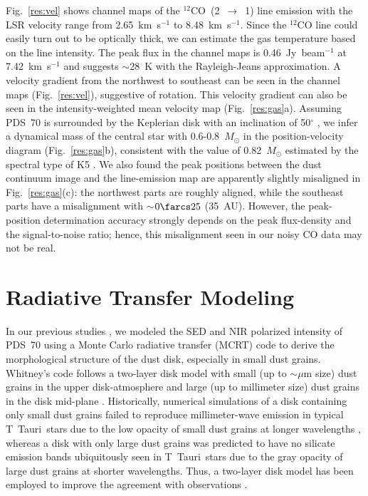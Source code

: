 \documentclass[apj]{emulateapj-rtx4}
\begin{document}
  Fig.~\ref{res:vel} shows channel maps of the $^{12}$CO~(2~$\rightarrow$~1) line emission with the LSR velocity range from 
  2.65~km~s$^{-1}$ to 8.48~km~s$^{-1}$. 
    Since the $^{12}$CO line could easily turn out to be optically thick, we can estimate the gas temperature 
    based on the line intensity. The peak flux in the channel maps is 0.46~Jy~beam$^{-1}$ at 7.42~km~s$^{-1}$ and 
    suggests $\sim$28~K with the Rayleigh-Jeans approximation.
  A velocity gradient from the northwest to southeast can be seen in the channel maps (Fig.~\ref{res:vel}),
  suggestive of rotation. This velocity gradient can also be seen in the intensity-weighted mean velocity map
  (Fig.~\ref{res:gas}a). Assuming PDS~70 is surrounded by the Keplerian disk with an inclination of 50$^{\circ}$ \citep{hash12},
  we infer a dynamical mass of the central star with 0.6-0.8~$M_{\odot}$ in the position-velocity diagram (Fig.~\ref{res:gas}b), 
  consistent with the value of 0.82~$M_{\odot}$ estimated by the spectral type of K5 \citep{riau06}. 
  We also found the peak positions between the dust continuum image and the line-emission map are apparently 
  slightly misaligned in Fig.~\ref{res:gas}(c): the northwest parts are roughly aligned, 
  while the southeast parts have a misalignment with $\sim$$0\farcs25$ (35~AU).
  However, the peak-position determination accuracy strongly depends on the peak flux-density and the signal-to-noise ratio;
  hence, this misalignment seen in our noisy CO data may not be real.

  \section{Radiative Transfer Modeling}\label{sec:model} 

  In our previous studies \citep{hash12,dong12b}, we modeled the SED and NIR polarized intensity of PDS~70
  using a Monte Carlo radiative transfer (MCRT) code \citep{whit13} to derive the morphological structure of the dust disk,
  especially in small dust grains. Whitney's code follows a two-layer disk model with small (up to $\sim$$\mu$m size) 
  dust grains in the upper disk-atmosphere and large (up to millimeter size) dust grains in the disk mid-plane \citep[e.g.,][]{dale06}. 
  Historically, numerical simulations of a disk containing only small dust grains failed to reproduce millimeter-wave emission 
  in typical T~Tauri~stars due to the low opacity of small dust grains at longer wavelengths \citep{dale99}, 
  whereas a disk with only large dust grains was predicted to have no silicate emission bands \citep{dale01} 
  ubiquitously seen in T~Tauri~stars \citep[e.g.,][]{furl09} due to the gray opacity of large dust grains at shorter wavelengths.
  Thus, a two-layer disk model has been employed to improve the agreement with observations 
  \citep[e.g.,][]{chia01}. 
\end{document}
